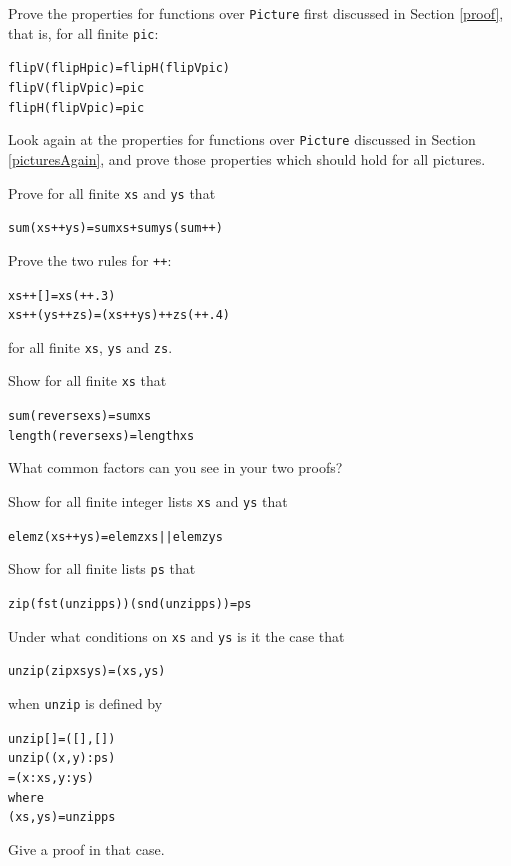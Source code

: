 \begin{exercises}

\item
Prove the properties for functions over \texttt{Picture} first discussed in Section \ref{proof}, that is, for all finite \texttt{pic}:
\begin{alltt}
flipV (flipH pic) = flipH (flipV pic)
flipV (flipV pic) = pic
flipH (flipV pic) = pic
\end{alltt}


\item
Look again at the properties for functions over \texttt{Picture} discussed in Section \ref{picturesAgain}, and prove those properties which should hold for all pictures.




\item
Prove for all finite \texttt{xs} and \texttt{ys} that
\begin{alltt}
sum (xs ++ ys) = sum xs + sum ys	\hfill(sum++)
\end{alltt}

\item
Prove the two rules for \texttt{++}:
\begin{alltt}
xs ++ [] = xs\hfill(++.3)
xs ++ (ys ++ zs) = (xs ++ ys) ++ zs\hfill(++.4)
\end{alltt}
for all finite \texttt{xs}, \texttt{ys} and \texttt{zs}.

\item
Show for all finite \texttt{xs} that
\begin{alltt}
sum (reverse xs)    = sum xs
length (reverse xs) = length xs
\end{alltt}
What common factors can you see in your two proofs?

\item
Show for all finite integer lists \texttt{xs} and \texttt{ys} that
\begin{alltt}
elem z (xs ++ ys) = elem z xs || elem z ys
\end{alltt}

\item
Show for all finite lists \texttt{ps} that
\begin{alltt}
zip (fst (unzip ps)) (snd (unzip ps)) = ps
\end{alltt}
Under what conditions on \texttt{xs} and \texttt{ys} is it the case that
\begin{alltt}
unzip (zip xs ys) = (xs,ys)
\end{alltt}
when \texttt{unzip} is defined by
\begin{alltt}
unzip [] = ([],[])
unzip ((x,y):ps) 
  = (x:xs,y:ys)
    where
    (xs,ys) = unzip ps                   
\end{alltt}
Give a proof in that case.


\end{exercises}
